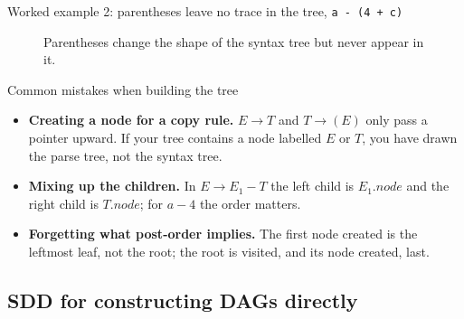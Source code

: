 \documentclass[11pt,a4paper]{article}
\newcommand{\at}[2]{\ensuremath{#1.\mathit{#2}}}
\begin{document}
\begin{examplebox}{Worked example 2: parentheses leave no trace in the tree, \texttt{a - (4 + c)}}
\begin{figure}[H]
\centering
{}
\caption{Parentheses change the shape of the syntax tree but never appear in it.}
\label{fig:sddtree-paren}
\end{figure}
\end{examplebox}

\begin{pitfallbox}{Common mistakes when building the tree}
\begin{itemize}[nosep]
\item \textbf{Creating a node for a copy rule.} $E\to T$ and $T\to(E)$ only pass a pointer upward. If your tree contains a node labelled $E$ or $T$, you have drawn the parse tree, not the syntax tree.
\item \textbf{Mixing up the children.} In $E\to E_1-T$ the left child is $\at{E_1}{node}$ and the right child is $\at{T}{node}$; for $a-4$ the order matters.
\item \textbf{Forgetting what post-order implies.} The first node created is the leftmost leaf, not the root; the root is visited, and its node created, last.
\end{itemize}
\end{pitfallbox}

\subsection{SDD for constructing DAGs directly}
\label{sec:sdddag}
\end{document}
